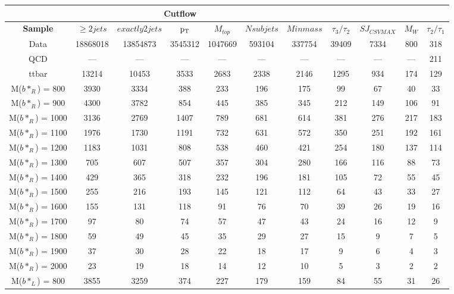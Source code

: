 \begin{table}
\begin{center}
\begin{small}
\begin{tabular}{|c||c|c|c|c|c|c|c|c|c|c|}
\multicolumn{8}{c}{Cutflow} \\
\hline
\bf{Sample} & \bf{$\geq 2 jets$} & \bf{$exactly 2 jets$} & \bf{$\mathrm{p_{T}}$} & \bf{$M_{top}$} & \bf{$Nsubjets$} &  \bf{$Minmass$}  & $\tau_3/\tau_2$  & $SJ_{CSVMAX}$  & \bf{$M_{W}$} & $\tau_2/\tau_1$ \\ 
\hline\hline
Data & 18868018 & 13854873 & 3545312 & 1047669 & 593104 & 337754 & 39409 & 7334 & 800 & 318\\ 
\hline
QCD & --- & --- & --- & --- & --- & --- & --- & --- & --- & 211\\ 
\hline
ttbar & 13214 & 10453 & 3533 & 2683 & 2338 & 2146 & 1295 & 934 & 174 & 129\\ 
\hline
M($b*_{R}$) = 800 & 3930 & 3334 & 388 & 233 & 196 & 175 & 99 & 67 & 40 & 33\\ 
\hline
M($b*_{R}$) = 900 & 4300 & 3782 & 854 & 445 & 385 & 345 & 212 & 149 & 106 & 91\\ 
\hline
M($b*_{R}$) = 1000 & 3136 & 2769 & 1407 & 789 & 681 & 614 & 381 & 276 & 217 & 183\\ 
\hline
M($b*_{R}$) = 1100 & 1976 & 1730 & 1191 & 732 & 631 & 572 & 350 & 251 & 192 & 161\\ 
\hline
M($b*_{R}$) = 1200 & 1183 & 1031 & 808 & 538 & 460 & 421 & 254 & 180 & 137 & 114\\ 
\hline
M($b*_{R}$) = 1300 & 705 & 607 & 507 & 357 & 304 & 280 & 166 & 116 & 88 & 73\\ 
\hline
M($b*_{R}$) = 1400 & 429 & 365 & 318 & 232 & 196 & 181 & 105 & 72 & 55 & 45\\ 
\hline
M($b*_{R}$) = 1500 & 255 & 216 & 193 & 145 & 121 & 112 & 64 & 43 & 33 & 27\\ 
\hline
M($b*_{R}$) = 1600 & 155 & 131 & 118 & 91 & 76 & 70 & 39 & 26 & 19 & 16\\ 
\hline
M($b*_{R}$) = 1700 & 97 & 80 & 74 & 57 & 47 & 43 & 24 & 16 & 12 & 9\\ 
\hline
M($b*_{R}$) = 1800 & 59 & 49 & 45 & 35 & 29 & 27 & 15 & 9 & 7 & 5\\ 
\hline
M($b*_{R}$) = 1900 & 37 & 30 & 28 & 22 & 18 & 17 & 9 & 6 & 4 & 3\\ 
\hline
M($b*_{R}$) = 2000 & 23 & 19 & 18 & 14 & 12 & 10 & 5 & 3 & 2 & 2\\ 
\hline
M($b*_{L}$) = 800 & 3855 & 3259 & 374 & 227 & 179 & 159 & 84 & 55 & 31 & 26\\ 

\end{tabular}
\end{small}
\end{center}
\end{table}
